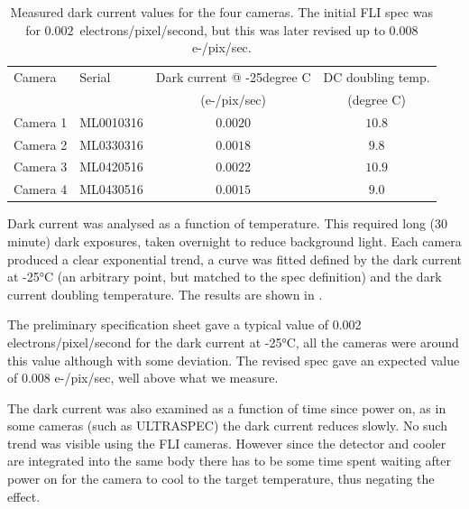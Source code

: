 \begin{colsection}
\begin{colsection}
\begin{table}
    \begin{center}
        \begin{tabular}{ll|cc} %
            Camera   & Serial    & Dark current @ -25degree C & DC doubling temp. \\
                     &           & (e-/pix/sec)               & (degree C)        \\
            \midrule
            Camera 1 & ML0010316 & $0.0020$                   & $10.8$            \\
            Camera 2 & ML0330316 & $0.0018$                   & $9.8$             \\
            Camera 3 & ML0420516 & $0.0022$                   & $10.9$            \\
            Camera 4 & ML0430516 & $0.0015$                   & $9.0$             \\
        \end{tabular}
    \end{center}
    \caption[TODO]{
        Measured dark current values for the four cameras. The initial FLI spec was for $0.002$~electrons/pixel/second, but this was later revised up to $0.008$ e-/pix/sec.
        }\label{tab:dark}
\end{table}

Dark current was analysed as a function of temperature. This required long (30 minute) dark exposures, taken overnight to reduce background light. Each camera produced a clear exponential trend, a curve was fitted defined by the dark current at -25°C (an arbitrary point, but matched to the spec definition) and the dark current doubling temperature. The results are shown in .

The preliminary specification sheet gave a typical value of 0.002 electrons/pixel/second for the dark current at -25°C, all the cameras were around this value although with some deviation. The revised spec gave an expected value of 0.008 e-/pix/sec, well above what we measure.

The dark current was also examined as a function of time since power on, as in some cameras (such as ULTRASPEC) the dark current reduces slowly. No such trend was visible using the FLI cameras. However since the detector and cooler are integrated into the same body there has to be some time spent waiting after power on for the camera to cool to the target temperature, thus negating the effect.

\newpage

\end{colsection}
\end{colsection}
